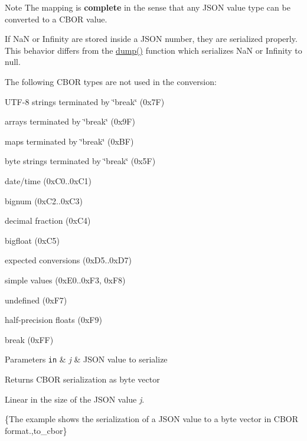 \begin{DoxyNote}{Note}
The mapping is {\bfseries complete} in the sense that any J\+S\+ON value type can be converted to a C\+B\+OR value.

If NaN or Infinity are stored inside a J\+S\+ON number, they are serialized properly. This behavior differs from the \hyperlink{classnlohmann_1_1basic__json_ab1ec1c1d1bd4de221a527405d3406556}{dump()} function which serializes NaN or Infinity to {\ttfamily null}.

The following C\+B\+OR types are not used in the conversion\+:
\begin{DoxyItemize}
\item U\+T\+F-\/8 strings terminated by \char`\"{}break\char`\"{} (0x7F)
\item arrays terminated by \char`\"{}break\char`\"{} (0x9F)
\item maps terminated by \char`\"{}break\char`\"{} (0x\+BF)
\item byte strings terminated by \char`\"{}break\char`\"{} (0x5F)
\item date/time (0x\+C0..0x\+C1)
\item bignum (0x\+C2..0x\+C3)
\item decimal fraction (0x\+C4)
\item bigfloat (0x\+C5)
\item expected conversions (0x\+D5..0x\+D7)
\item simple values (0x\+E0..0x\+F3, 0x\+F8)
\item undefined (0x\+F7)
\item half-\/precision floats (0x\+F9)
\item break (0x\+FF)
\end{DoxyItemize}
\end{DoxyNote}

\begin{DoxyParams}[1]{Parameters}
\mbox{\tt in}  & {\em j} & J\+S\+ON value to serialize \\
\hline
\end{DoxyParams}
\begin{DoxyReturn}{Returns}
C\+B\+OR serialization as byte vector
\end{DoxyReturn}
Linear in the size of the J\+S\+ON value {\itshape j}.

\{The example shows the serialization of a J\+S\+ON value to a byte vector in C\+B\+OR format.,to\+\_\+cbor\}

